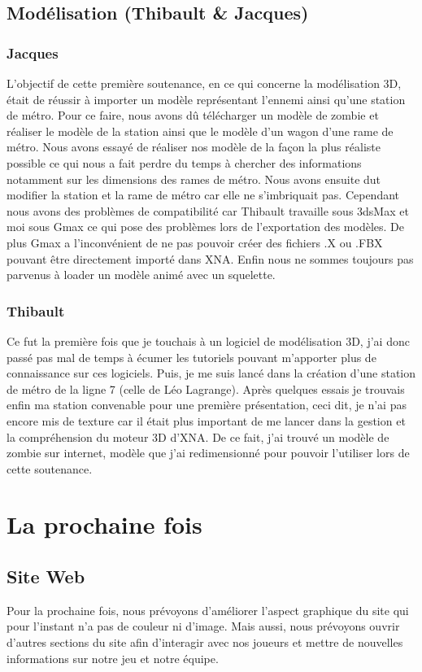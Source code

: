 \documentclass[12pt,a4paper]{article} %
\begin{document}
\subsection {Modélisation (Thibault & Jacques)}
\subsubsection {Jacques}
L'objectif de cette première soutenance, en ce qui concerne la modélisation 3D, était de réussir à importer un modèle représentant l'ennemi ainsi qu'une station de métro. Pour ce faire, nous avons dû télécharger un modèle de zombie et réaliser le modèle de la station ainsi que le modèle d'un wagon d'une rame de métro. Nous avons essayé de réaliser nos modèle de la façon la plus réaliste possible ce qui nous a fait perdre du temps à chercher des informations notamment sur les dimensions des rames de métro. Nous avons ensuite dut modifier la station et la rame de métro car elle ne s’imbriquait pas. Cependant nous avons des problèmes de compatibilité car Thibault travaille sous 3dsMax et moi sous Gmax ce qui pose des problèmes lors de l'exportation des modèles. De plus Gmax a l'inconvénient de ne pas pouvoir créer des fichiers .X ou .FBX pouvant être directement importé dans XNA. Enfin nous ne sommes toujours pas parvenus à loader un modèle animé avec un squelette. \\
\subsubsection{Thibault}
Ce fut la première fois que je touchais à un logiciel de modélisation 3D, j'ai donc passé pas mal de temps à écumer les tutoriels pouvant m'apporter plus de connaissance sur ces logiciels. Puis, je me suis lancé dans la création d'une station de métro de la ligne 7 (celle de Léo Lagrange). Après quelques essais je trouvais enfin ma station convenable pour une première présentation, ceci dit, je n'ai pas encore mis de texture car il était plus important de me lancer dans la gestion et la compréhension du moteur 3D d'XNA. De ce fait, j'ai trouvé un modèle de zombie sur internet, modèle que j'ai redimensionné pour pouvoir l'utiliser lors de cette soutenance.
\newpage
\section {La prochaine fois}
\subsection {Site Web}
Pour la prochaine fois, nous prévoyons d'améliorer l'aspect graphique du site qui pour l'instant n'a pas de couleur ni d'image. Mais aussi, nous prévoyons ouvrir d'autres sections du site afin d'interagir avec nos joueurs et mettre de nouvelles informations sur notre jeu et notre équipe.
\end{document}
